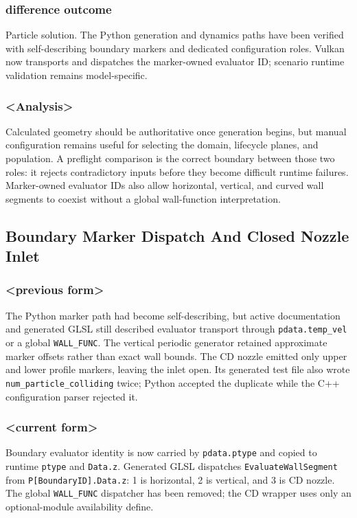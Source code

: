 \subsubsection{difference outcome}

Particle solution.  The Python generation and dynamics paths have been
verified with self-describing boundary markers and dedicated configuration
roles.  Vulkan now transports and dispatches the marker-owned evaluator ID;
scenario runtime validation remains model-specific.

\subsubsection{<Analysis>}

Calculated geometry should be authoritative once generation begins, but manual
configuration remains useful for selecting the domain, lifecycle planes, and
population.  A preflight comparison is the correct boundary between those two
roles: it rejects contradictory inputs before they become difficult runtime
failures.  Marker-owned evaluator IDs also allow horizontal, vertical, and
curved wall segments to coexist without a global wall-function interpretation.

\subsection{Boundary Marker Dispatch And Closed Nozzle Inlet}

\subsubsection{<previous form>}

The Python marker path had become self-describing, but active documentation and
generated GLSL still described evaluator transport through
\texttt{pdata.temp\_vel} or a global \texttt{WALL\_FUNC}.  The vertical
periodic generator retained approximate marker offsets rather than exact wall
bounds.  The CD nozzle emitted only upper and lower profile markers, leaving
the inlet open.  Its generated test file also wrote
\texttt{num\_particle\_colliding} twice; Python accepted the duplicate while
the C++ configuration parser rejected it.

\subsubsection{<current form>}

Boundary evaluator identity is now carried by \texttt{pdata.ptype} and copied
to runtime \texttt{ptype} and \texttt{Data.z}.  Generated GLSL dispatches
\texttt{EvaluateWallSegment} from \texttt{P[BoundaryID].Data.z}: 1 is
horizontal, 2 is vertical, and 3 is CD nozzle.  The global
\texttt{WALL\_FUNC} dispatcher has been removed; the CD wrapper uses only an
optional-module availability define.

